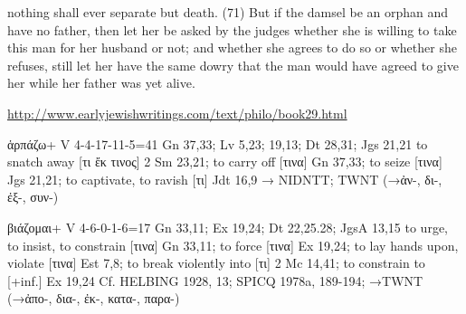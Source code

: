 \documentclass[11pt]{article}
\begin{document}
{nothing shall ever separate but death. (71) But if the damsel be an orphan and have no father, then let her be asked by the judges whether she is willing to take this man for her husband or not; and whether she agrees to do so or whether she refuses, still let her have the same dowry that the man would have agreed to give her while her father was yet alive.

\url{http://www.earlyjewishwritings.com/text/philo/book29.html}


\begin{greek} ἁρπάζω+ V 4-4-17-11-5=41
Gn 37,33; Lv 5,23; 19,13; Dt 28,31; Jgs 21,21
to snatch away [τι ἔκ τινος] 2 Sm 23,21; to carry off [τινα] Gn 37,33; to seize [τινα] Jgs 21,21; to
captivate, to ravish [τι] Jdt 16,9
→ NIDNTT; TWNT
(→ἀν-, δι-, ἐξ-, συν-) 
\end{greek}

\begin{greek}
βιάζομαι+ V 4-6-0-1-6=17
Gn 33,11; Ex 19,24; Dt 22,25.28; JgsA 13,15
to urge, to insist, to constrain [τινα] Gn 33,11; to force [τινα] Ex 19,24; to lay hands upon, violate [τινα]
Est 7,8; to break violently into [τι] 2 Mc 14,41; to constrain to [+inf.] Ex 19,24
Cf. HELBING 1928, 13; SPICQ 1978a, 189-194; →TWNT
(→ἀπο-, δια-, ἐκ-, κατα-, παρα-) 
\end{greek}


}
\end{document}
